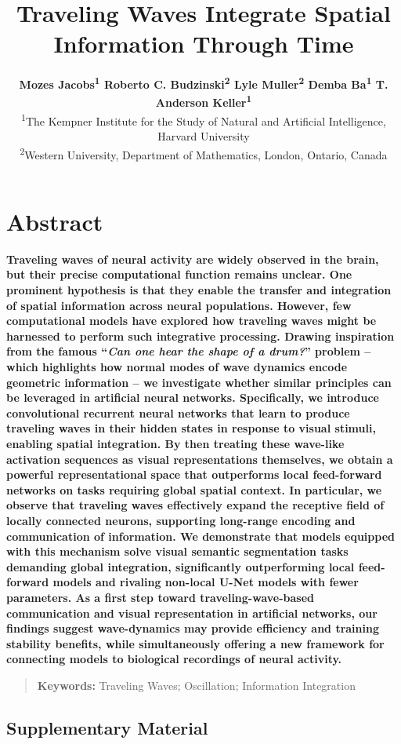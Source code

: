 \documentclass[10pt,letterpaper]{article}
\title{Traveling Waves Integrate Spatial Information Through Time}
\author{
    {\large \bf Mozes Jacobs\textsuperscript{1} \quad 
    Roberto C. Budzinski\textsuperscript{2} \quad 
    Lyle Muller\textsuperscript{2} \quad 
    Demba Ba\textsuperscript{1} \quad 
    T. Anderson Keller\textsuperscript{1}} \\
    \textsuperscript{1}The Kempner Institute for the Study of Natural and Artificial Intelligence, Harvard University \\
    \textsuperscript{2}Western University, Department of Mathematics, London, Ontario, Canada \\
}
\begin{document}
\maketitle

\section{Abstract}
{
\bf
Traveling waves of neural activity are widely observed in the brain, but their precise computational function remains unclear. One prominent hypothesis is that they enable the transfer and integration of spatial information across neural populations. However, few computational models have explored how traveling waves might be harnessed to perform such integrative processing. Drawing inspiration from the famous “\emph{Can one hear the shape of a drum?}” problem -- which highlights how normal modes of wave dynamics encode geometric information -- we investigate whether similar principles can be leveraged in artificial neural networks. Specifically, we introduce convolutional recurrent neural networks that learn to produce traveling waves in their hidden states in response to visual stimuli, enabling spatial integration. By then treating these wave-like activation sequences as visual representations themselves, we obtain a powerful representational space that outperforms local feed-forward networks on tasks requiring global spatial context. In particular, we observe that traveling waves effectively expand the receptive field of locally connected neurons, supporting long-range encoding and communication of information. We demonstrate that models equipped with this mechanism solve visual semantic segmentation tasks demanding global integration, significantly outperforming local feed-forward models and rivaling non-local U-Net models with fewer parameters. As a first step toward traveling-wave-based communication and visual representation in artificial networks, our findings suggest wave-dynamics may provide efficiency and training stability benefits, while simultaneously offering a new framework for connecting models to biological recordings of neural activity.
}
\begin{quote}
\small
\textbf{Keywords:} 
Traveling Waves; Oscillation; Information Integration
\end{quote}









\newpage





\appendix
\onecolumn
\begin{appendices}
\section{Supplementary Material}

\end{appendices}
\end{document}
